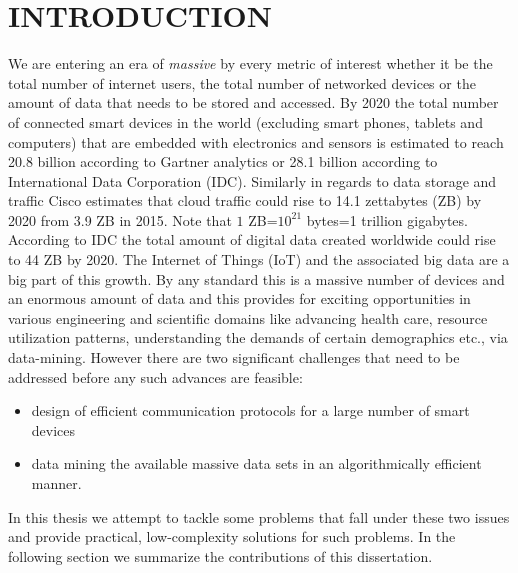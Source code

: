 %
%
%
%



\pagestyle{plain} %
\setcounter{page}{1}

\chapter{INTRODUCTION}
\indent We are entering an era of \emph{massive} by every metric of interest whether it be the total number of internet users, the total number of networked devices or the amount of data that needs to be stored and accessed. By 2020 the total number of connected smart devices in the world (excluding smart phones, tablets and computers) that are embedded with electronics and sensors is estimated to reach 20.8 billion according to Gartner analytics or 28.1 billion according to International Data Corporation (IDC). Similarly in regards to data storage and traffic Cisco estimates that cloud traffic could rise to 14.1 zettabytes (ZB) by 2020 from 3.9 ZB in 2015. Note that $1$ ZB=$10^{21}$ bytes=1 trillion gigabytes. According to IDC the total amount of digital data created worldwide could rise to 44 ZB by 2020. The Internet of Things (IoT) and the associated big data are a big part of this growth. By any standard this is a massive number of devices and an enormous amount of data and this provides for exciting opportunities in various engineering and scientific domains like advancing health care, resource utilization patterns, understanding the demands of certain demographics etc., via data-mining. However there are two significant challenges that need to be addressed before any such advances are feasible:
\begin{itemize}
\item design of efficient communication protocols for a large number of smart devices
\item data mining the available massive data sets in an algorithmically efficient manner.
\end{itemize}
In this thesis we attempt to tackle some problems that fall under these two issues and provide practical, low-complexity solutions for such problems. In the following section we summarize the contributions of this dissertation.

